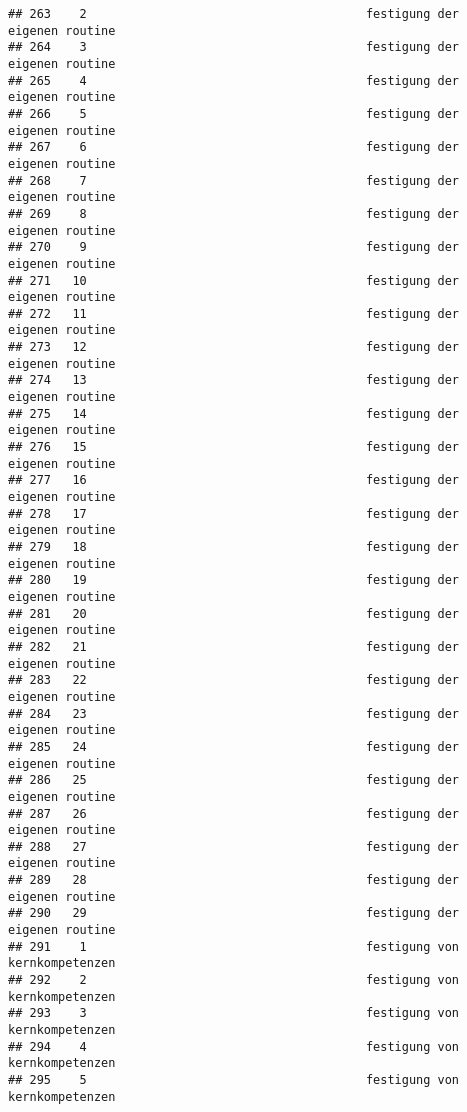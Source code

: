 \documentclass[
]{article}
\begin{document}
\begin{verbatim}
## 263    2                                       festigung der eigenen routine
## 264    3                                       festigung der eigenen routine
## 265    4                                       festigung der eigenen routine
## 266    5                                       festigung der eigenen routine
## 267    6                                       festigung der eigenen routine
## 268    7                                       festigung der eigenen routine
## 269    8                                       festigung der eigenen routine
## 270    9                                       festigung der eigenen routine
## 271   10                                       festigung der eigenen routine
## 272   11                                       festigung der eigenen routine
## 273   12                                       festigung der eigenen routine
## 274   13                                       festigung der eigenen routine
## 275   14                                       festigung der eigenen routine
## 276   15                                       festigung der eigenen routine
## 277   16                                       festigung der eigenen routine
## 278   17                                       festigung der eigenen routine
## 279   18                                       festigung der eigenen routine
## 280   19                                       festigung der eigenen routine
## 281   20                                       festigung der eigenen routine
## 282   21                                       festigung der eigenen routine
## 283   22                                       festigung der eigenen routine
## 284   23                                       festigung der eigenen routine
## 285   24                                       festigung der eigenen routine
## 286   25                                       festigung der eigenen routine
## 287   26                                       festigung der eigenen routine
## 288   27                                       festigung der eigenen routine
## 289   28                                       festigung der eigenen routine
## 290   29                                       festigung der eigenen routine
## 291    1                                       festigung von kernkompetenzen
## 292    2                                       festigung von kernkompetenzen
## 293    3                                       festigung von kernkompetenzen
## 294    4                                       festigung von kernkompetenzen
## 295    5                                       festigung von kernkompetenzen

\end{verbatim}
\end{document}
